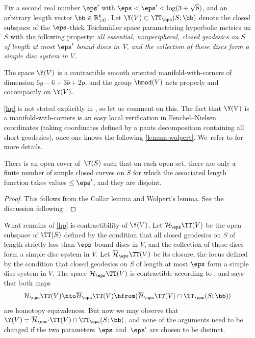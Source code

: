 Fix a second real number $\eps'$ with $\eps<\eps'<\log(3+\sqrt 8)$, and an arbitrary length vector $\bb \in \mathbb R^b_{>0}$. Let $\Y(V) \subset \TT_\eps(S;\bb)$ denote the closed subspace of the $\eps$-thick Teichmüller space parametrising hyperbolic metrics on $S$ with the following property:
\emph{all essential, nonperipheral, closed geodesics on $S$ of length at most $\eps'$ bound discs in~$V$, and the collection of these discs form a simple disc system in $V$.}

\begin{thm}\label{hp}
The space $\Y(V)$ is a contractible smooth oriented manifold-with-corners of dimension $6g-6+3b+2p$, and the group $\hmod(V)$ acts properly and cocompactly on $\Y(V).$
\end{thm}

\cref{hp} is not stated explicitly in \cite{hainautpetersen}, so let us comment on this. The fact that $\Y(V)$ is a manifold-with-corners is an easy local verification in Fenchel--Nielsen coordinates (taking coordinates defined by a pants decomposition containing all short geodesics), once one knows the following \cref{lemma:wolpert}. We~refer to \cite[\S 2]{hainautpetersen} for more details.

\begin{lem}\label{lemma:wolpert}
There is an open cover of $\,\T(S)$ such that on each open set, there are only a finite number of simple closed curves on $S$ for which the associated length function takes values $\leq \eps'$, and they are disjoint.
\end{lem}

\begin{proof}This follows from the Collar lemma and Wolpert's lemma. See the discussion following \cite[Th.\,2.3]{hainautpetersen}.
\end{proof}
What remains of \cref{hp} is contractibility of $\Y(V)$. Let $\mathcal{H}_\eps\TT(V)$ be the open subspace of $\TT(S)$ defined by the condition that all closed geodesics on $S$ of length strictly less than $\eps$ bound discs in $V$, and the collection of these discs form a simple disc system in $V$. Let $\overline{\mathcal{H}}_\eps\TT(V)$ be its closure, \ie the locus defined by the condition that closed geodesics on $S$ of length at most $\eps$ form a simple disc system in $V$. The space $\mathcal{H}_\eps\TT(V)$ is contractible according to \cite[Th.\,1.4]{hainautpetersen}, and \cite[Prop.\,3.5]{hainautpetersen} says that both maps\vspace*{-3pt}\enlargethispage{.5\baselineskip}
\[
\mathcal{H}_\eps\TT(V) \hto \overline{\mathcal{H}}_\eps\TT(V) \hfrom (\overline{\mathcal{H}}_\eps\TT(V) \cap \TT_\eps(S;\bb))
\]
are homotopy equivalences. But now we may observe that $\Y(V) = \overline{\mathcal{H}}_{\eps'}\TT(V) \cap \TT_\eps(S;\bb)$, and none of the arguments need to be changed if the two parameters~$\eps$ and~$\eps'$ are chosen to be distinct.

